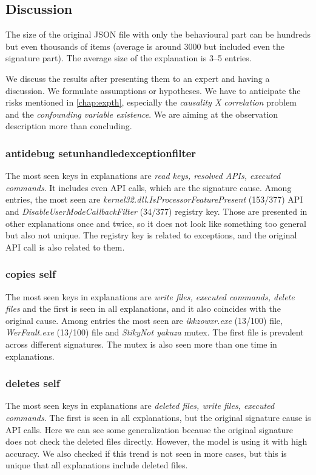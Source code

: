 \subsection{Discussion}
The size of the original JSON file with only the behavioural part can be hundreds but even thousands of items (average is around $3000$ but included even the signature part). The average size of the explanation is 3--5 entries.

We discuss the results after presenting them to an expert and having a discussion. We formulate assumptions or hypotheses. We have to anticipate the risks mentioned in \ref{chap:expth}, especially the \emph{causality X correlation} problem and the \emph{confounding variable existence}. We are aiming at the observation description more than concluding.

\subsubsection*{antidebug setunhandledexceptionfilter}
The most seen keys in explanations are \emph{read keys, resolved APIs, executed commands}. It includes even API calls, which are the signature cause. Among entries, the most seen are \emph{kernel32.dll.IsProcessorFeaturePresent} (153/377) API and \emph{DisableUserModeCallbackFilter} (34/377) registry key. Those are presented in other explanations once and twice, so it does not look like something too general but also not unique. The registry key is related to exceptions, and the original API call is also related to them.

\subsubsection*{copies self}
The most seen keys in explanations are \emph{write files, executed commands, delete files} and the first is seen in all explanations, and it also coincides with the original cause. Among entries the most seen are \emph{ikkzowxr.exe} (13/100) file, \emph{WerFault.exe} (13/100) file and \emph{StikyNot yakuza} mutex. The first file is prevalent across different signatures. The mutex is also seen more than one time in explanations.

\subsubsection*{deletes self}
The most seen keys in explanations are \emph{deleted files, write files, executed commands}. The first is seen in all explanations, but the original signature cause is API calls. Here we can see some generalization because the original signature does not check the deleted files directly. However, the model is using it with high accuracy. We also checked if this trend is not seen in more cases, but this is unique that all explanations include deleted files.

